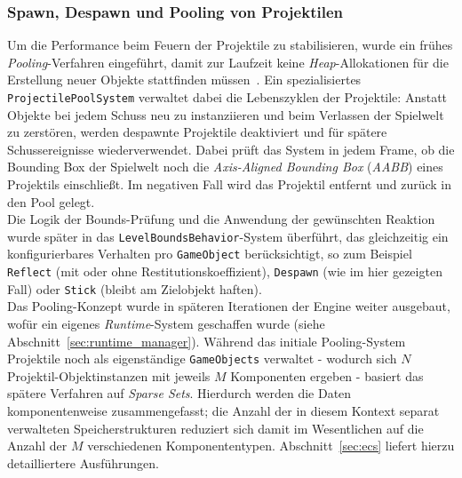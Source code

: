 \subsubsection{Spawn, Despawn und Pooling von Projektilen}

Um die Performance beim Feuern der Projektile zu stabilisieren, wurde ein frühes \textit{Pooling}-Verfahren eingeführt, damit zur Laufzeit keine \textit{Heap}-Allokationen für die Erstellung neuer Objekte stattfinden müssen~\cite[S. 1074-1079]{Gre24}.
Ein spezialisiertes \texttt{ProjectilePoolSystem} verwaltet dabei die Lebenszyklen der Projektile:
Anstatt Objekte bei jedem Schuss neu zu instanziieren und beim Verlassen der Spielwelt zu zerstören, werden despawnte Projektile deaktiviert und für spätere Schussereignisse wiederverwendet.
Dabei prüft das System in jedem Frame, ob die Bounding Box der Spielwelt noch die \textit{Axis-Aligned Bounding Box} (\textit{AABB}) eines Projektils einschließt.
Im negativen Fall wird das Projektil entfernt und zurück in den Pool gelegt.\\

Die Logik der Bounds-Prüfung und die Anwendung der gewünschten Reaktion wurde später in das \texttt{LevelBoundsBehavior}-System überführt, das gleichzeitig ein konfigurierbares Verhalten pro \texttt{GameObject} berücksichtigt, so zum Beispiel \texttt{Reflect} (mit oder ohne Restitutionskoeffizient), \texttt{Despawn} (wie im hier gezeigten Fall) oder \texttt{Stick} (bleibt am Zielobjekt haften).\\

Das Pooling-Konzept wurde in späteren Iterationen der Engine weiter ausgebaut, wofür ein eigenes \textit{Runtime}-System geschaffen wurde (siehe Abschnitt~\ref{sec:runtime_manager}).
Während das initiale Pooling-System Projektile noch als eigenständige \texttt{GameObjects} verwaltet - wodurch sich $N$ Projektil-Objektinstanzen mit jeweils $M$ Komponenten ergeben - basiert das spätere Verfahren auf \textit{Sparse Sets}.
Hierdurch werden die Daten komponentenweise zusammengefasst; die Anzahl der in diesem Kontext separat verwalteten Speicherstrukturen reduziert sich damit im Wesentlichen auf die Anzahl der $M$ verschiedenen Komponententypen.
Abschnitt~\ref{sec:ecs} liefert hierzu detailliertere Ausführungen.